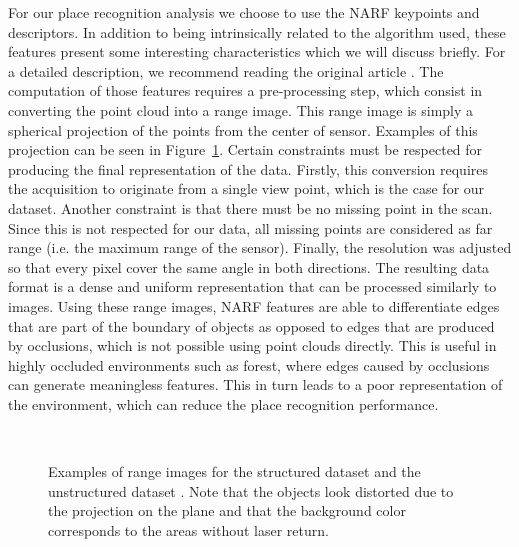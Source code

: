 For our place recognition analysis we choose to use the NARF keypoints and descriptors. In addition to being intrinsically related to the algorithm used, these features present some interesting characteristics which we will discuss briefly. For a detailed description, we recommend reading the original article \citet{Steder2011b}. The computation of those features requires a pre-processing step, which consist in converting the point cloud into a range image. This range image is simply a spherical projection of the points from the center of sensor. Examples of this projection can be seen in Figure~\ref{fig:chap_slam_range}. Certain constraints must be respected for producing the final representation of the data. Firstly, this conversion requires the acquisition to originate from a single view point, which is the case for our dataset. Another constraint is that there must be no missing point in the scan. Since this is not respected for our data, all missing points are considered as far range (i.e. the maximum range of the sensor). Finally, the resolution was adjusted so that every pixel cover the same angle in both directions. The resulting data format is a dense and uniform representation that can be processed similarly to images. Using these range images, NARF features are able to differentiate edges that are part of the boundary of objects as opposed to edges that are produced by occlusions, which is not possible using point clouds directly. This is useful in highly occluded environments such as forest, where edges caused by occlusions can generate meaningless features. This in turn leads to a poor representation of the environment, which can reduce the place recognition performance.

\begin{figure}[H]
    \centering
    \\
    \caption{Examples of range images for the structured dataset \protect{} and the unstructured dataset \protect{}. Note that the objects look distorted due to the projection on the plane and that the background color corresponds to the areas without laser return.}
    \label{fig:chap_slam_range}
\end{figure}

